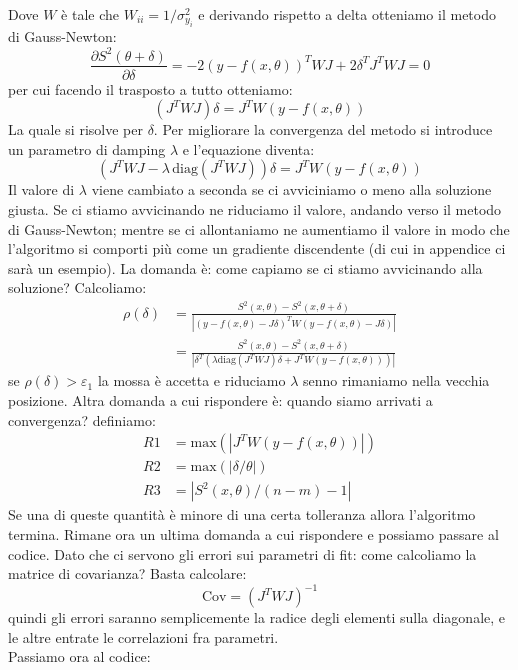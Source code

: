 \documentclass[10pt,a4paper]{article}
\begin{document}
Dove $W$ è tale che $W_{ii} = 1/ \sigma_{y_i}^2$ e derivando rispetto a delta otteniamo il metodo di Gauss-Newton:
\begin{equation}
\frac{\partial S^2(\theta + \delta)}{\partial \delta} = - 2(y - f(x, \theta))^{T} W J + 2 \delta^T J^T W J=0
\end{equation}
per cui facendo il trasposto a tutto otteniamo:
\begin{equation}
(J^T W J) \delta = J^T W (y - f(x, \theta))
\end{equation}
La quale si risolve per $\delta$. Per migliorare la convergenza del metodo si introduce un parametro di damping $\lambda$ e l'equazione diventa:
\begin{equation}
(J^T W J - \lambda \, \text{diag}(J^T W J)) \delta = J^T W (y - f(x, \theta))
\end{equation}
Il valore di $\lambda$ viene cambiato a seconda se ci avviciniamo o meno alla soluzione giusta. Se ci stiamo avvicinando ne riduciamo il valore, andando verso il metodo di Gauss-Newton; mentre se ci allontaniamo ne aumentiamo il valore in modo che l'algoritmo si comporti più come un gradiente discendente (di cui in appendice ci sarà un esempio). La domanda è: come capiamo se ci stiamo avvicinando alla soluzione? Calcoliamo:
\begin{equation}
\begin{split}
\rho(\delta) &= \frac{S^2(x, \theta) - S^2(x, \theta + \delta)}{|(y - f(x, \theta) - J \delta)^{T} W (y - f(x, \theta) - J \delta)|} \\
& = \frac{S^2(x, \theta) - S^2(x, \theta + \delta)}{| \delta^T (\lambda \text{diag}(J^T W J) \delta + J^T W (y - f(x, \theta)))|}
\end{split}
\end{equation}
se $\rho(\delta) > \varepsilon_1$ la mossa è accetta e riduciamo $\lambda$ senno rimaniamo nella vecchia posizione.
Altra domanda a cui rispondere è: quando siamo arrivati a convergenza? definiamo:
\begin{align}
R1 &= \text{max}(|J^T W (y - f(x, \theta))|) \\
R2 &= \text{max}(| \delta/ \theta |) \\
R3 &= |S^2(x, \theta)/(n - m) - 1|
\end{align}
Se una di queste quantità è minore di una certa tolleranza allora l'algoritmo termina. Rimane ora un ultima domanda a cui rispondere e possiamo passare al codice. Dato che ci servono gli errori sui parametri di fit: come calcoliamo la matrice di covarianza? Basta calcolare:
\begin{equation}
\text{Cov} = (J^T W J)^{-1}
\end{equation}
quindi gli errori saranno semplicemente la radice degli elementi sulla diagonale, e le altre entrate le correlazioni fra parametri.\\
Passiamo ora al codice:
\end{document}
